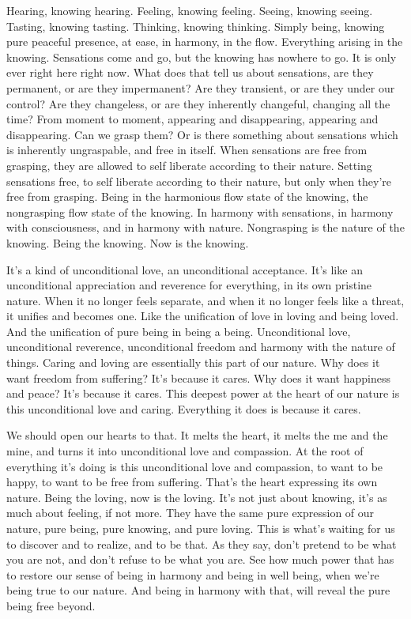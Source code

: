 \documentclass[12pt,openany]{book}
\begin{document}
Hearing, knowing hearing. Feeling, knowing feeling. Seeing, \linebreak knowing seeing. Tasting, knowing tasting. Thinking, knowing thinking. Simply being, knowing pure peaceful presence, at ease, in harmony, in the flow. Everything arising in the knowing. Sensations come and go, but the knowing has nowhere to go. It is only ever right here right now. What does that tell us about sensations, are they permanent, or are they impermanent? Are they transient, or are they under our control? Are they changeless, or are they inherently changeful, changing all the time? From moment to moment, appearing and disappearing, appearing and disappearing. Can we grasp them? Or is there something about sensations which is inherently ungraspable, and free in itself. When sensations are free from grasping, they are allowed to self liberate according to their nature. Setting sensations free, to self liberate according to their nature, but only when they’re free from grasping. Being in the harmonious flow state of the knowing, the nongrasping flow state of the knowing. In harmony with sensations, in harmony with consciousness, and in harmony with nature. Nongrasping is the nature of the knowing. Being the knowing. Now is the knowing.

It's a kind of unconditional love, an unconditional acceptance. It's like an unconditional appreciation and reverence for everything, in its own pristine nature. When it no longer feels separate, and when it no longer feels like a threat, it unifies and becomes one. Like the unification of love in loving and being loved. And the unification of pure being in being a being. Unconditional love, unconditional reverence, unconditional freedom and harmony with the nature of things. Caring and loving are essentially this part of our nature. Why does it want freedom from suffering? It's because it cares. Why does it want happiness and peace? It's because it cares. This deepest power at the heart of our nature is this unconditional love and caring. Everything it does is because it cares.

We should open our hearts to that. It melts the heart, it melts the me and the mine, and turns it into unconditional love and compassion. At the root of everything it's doing is this unconditional love and compassion, to want to be happy, to want to be free from suffering. That's the heart expressing its own nature. Being the loving, now is the loving. It’s not just about knowing, it's as much about feeling, if not more. They have the same pure expression of our nature, pure being, pure knowing, and pure loving. This is what's waiting for us to discover and to realize, and to be that. As they say, don't pretend to be what you are not, and don't refuse to be what you are. See how much power that has to restore our sense of being in harmony and being in well being, when we're being true to our nature. And being in harmony with that, will reveal the pure being free beyond.
\end{document}
